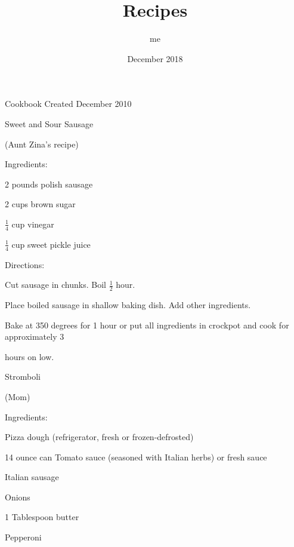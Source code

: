 \documentclass[a4paper,portrait,12pt]{book}
\title{Recipes}
\author{me }
\date{December 2018}
\begin{document}
\tableofcontents


Cookbook
Created December 2010



\newpage
Sweet and Sour Sausage






(Aunt Zina's recipe)




Ingredients:




2 pounds polish sausage




2 cups brown sugar




$\frac{1}{4}$ cup vinegar




$\frac{1}{4}$ cup sweet pickle juice




Directions:




Cut sausage in chunks. Boil $\frac{1}{2}$ hour.




Place boiled sausage in shallow baking dish. Add other ingredients.




Bake at 350 degrees for 1 hour or put all ingredients in crockpot and cook for approximately 3




hours on low.







\newpage
Stromboli




(Mom)




Ingredients:




Pizza dough (refrigerator, fresh or frozen-defrosted)




14 ounce can Tomato sauce (seasoned with Italian herbs) or fresh sauce




Italian sausage




Onions




1 Tablespoon butter




Pepperoni
\end{document}
